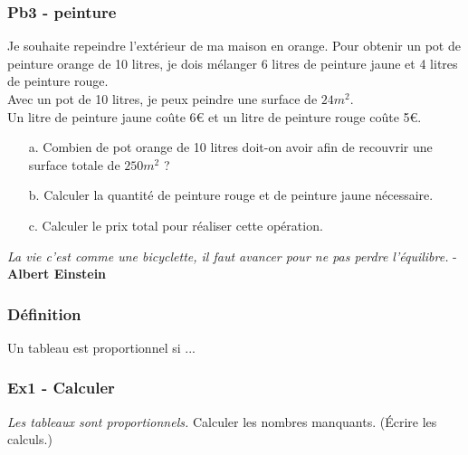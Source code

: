 \subsubsection*{Pb3 - peinture} 

Je souhaite repeindre l'extérieur de ma maison en orange. Pour obtenir un pot de peinture orange de 10 litres, je dois mélanger 6 litres de peinture jaune et 4 litres de peinture rouge.\\ 

Avec un pot de 10 litres, je peux peindre une surface de $24m^2$. \\

Un litre de peinture jaune coûte 6€ et un litre de peinture rouge coûte 5€. 

\begin{enumerate}
  \item[a.] Combien de pot orange de 10 litres doit-on avoir afin de recouvrir une surface totale de $250m^2$ ?
  \item[b.] Calculer la quantité de peinture rouge et de peinture jaune nécessaire.
  \item[c.] Calculer le prix total pour réaliser cette opération.  
\end{enumerate}

\newpage


\begin{center}
  \textit{La vie c’est comme une bicyclette, il faut avancer pour ne pas perdre l’équilibre.} - \textbf{Albert Einstein}
\end{center}


\subsubsection*{Définition}

Un tableau est proportionnel si ...

\subsubsection*{Ex1 - Calculer} 

\textit{Les tableaux sont proportionnels.} Calculer les nombres manquants. (Écrire les calculs.) 

